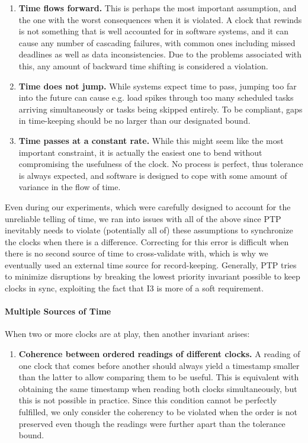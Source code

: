 \begin{enumerate}[label=I\arabic*.]
    \item \textbf{Time flows forward.} This is perhaps the most important assumption, and the one with the worst consequences when it is violated. A clock that rewinds is not something that is well accounted for in software systems, and it can cause any number of cascading failures, with common ones including missed deadlines as well as data inconsistencies. Due to the problems associated with this, any amount of backward time shifting is considered a violation.
    \item \textbf{Time does not jump.} While systems expect time to pass, jumping too far into the future can cause e.g. load spikes through too many scheduled tasks arriving simultaneously or tasks being skipped entirely. To be compliant, gaps in time-keeping should be no larger than our designated bound.
    \item \textbf{Time passes at a constant rate.} While this might seem like the most important constraint, it is actually the easiest one to bend without compromising the usefulness of the clock. No process is perfect, thus tolerance is always expected, and software is designed to cope with some amount of variance in the flow of time.
    \setcounter{errorConditions}{\value{enumi}}
\end{enumerate}

Even during our experiments, which were carefully designed to account for the unreliable telling of time, we ran into issues with all of the above since PTP inevitably needs to violate (potentially all of) these assumptions to synchronize the clocks when there is a difference. Correcting for this error is difficult when there is no second source of time to cross-validate with, which is why we eventually used an external time source for record-keeping. Generally, PTP tries to minimize disruptions by breaking the lowest priority invariant possible to keep clocks in sync, exploiting the fact that I3 is more of a soft requirement.

\paragraph*{Multiple Sources of Time}

When two or more clocks are at play, then another invariant arises:

\begin{enumerate}[label=I\arabic*.]
    \setcounter{enumi}{\value{errorConditions}}
    \item \textbf{Coherence between ordered readings of different clocks.} A reading of one clock that comes before another should always yield a timestamp smaller than the latter to allow comparing them to be useful. This is equivalent with obtaining the same timestamp when reading both clocks simultaneously, but this is not possible in practice. Since this condition cannot be perfectly fulfilled, we only consider the coherency to be violated when the order is not preserved even though the readings were further apart than the tolerance bound.
\end{enumerate}

